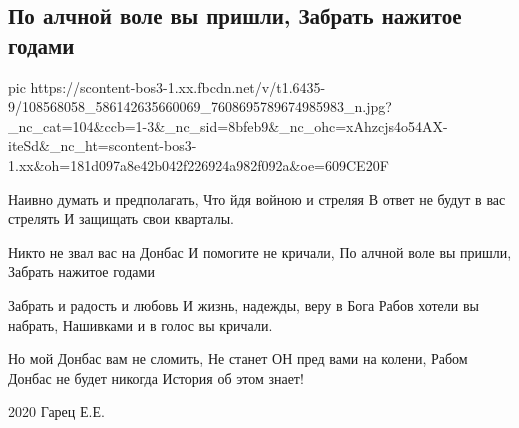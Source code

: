 
 
 
 
 
\subsection{По алчной воле вы пришли, Забрать нажитое годами}

\ifcmt
  pic https://scontent-bos3-1.xx.fbcdn.net/v/t1.6435-9/108568058_586142635660069_7608695789674985983_n.jpg?_nc_cat=104&ccb=1-3&_nc_sid=8bfeb9&_nc_ohc=xAhzcjs4o54AX-iteSd&_nc_ht=scontent-bos3-1.xx&oh=181d097a8e42b042f226924a982f092a&oe=609CE20F
\fi

Наивно думать и предполагать, 
Что йдя войною и стреляя 
В ответ не будут в вас стрелять 
И защищать свои кварталы. 

Никто не звал вас на Донбас 
И помогите не кричали, 
По алчной воле вы пришли, 
Забрать нажитое годами 

Забрать и радость и любовь 
И жизнь, надежды, веру в Бога 
Рабов хотели вы набрать, 
Нашивками и в голос вы кричали. 

Но мой Донбас вам не сломить, 
Не станет ОН пред вами на колени, 
Рабом Донбас не будет никогда 
История об этом знает! 

2020 Гарец Е.Е.
